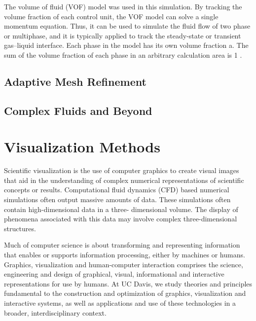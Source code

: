 The volume of fluid (VOF) model was used in this simulation. By tracking the volume fraction of each control unit, the VOF model can solve a single momentum equation. Thus, it can be used to simulate the fluid flow of two phase or multiphase, and it is typically applied to track the steady-state or transient gas–liquid interface.
Each phase in the model has its own volume fraction a. The sum of the volume fraction of each phase in an arbitrary calculation area is 1 \cite{lvSimulationFlowFluid2013}.
%

\subsection{Adaptive Mesh Refinement}

\subsection{Complex Fluids and Beyond}


\section{Visualization Methods}

Scientific visualization is the use of computer graphics to create visual images that aid in the understanding of complex numerical representations of scientific concepts or results. Computational fluid dynamics (CFD) based numerical simulations often output massive amounts of data. These simulations often contain high-dimensional data in a three- dimensional volume. The display of phenomena associated with this data may involve complex three-dimensional structures.
%

Much of computer science is about transforming and representing information that enables or supports information processing, either by machines or humans. Graphics, visualization and human-computer interaction comprises the science, engineering and design of graphical, visual, informational and interactive representations for use by humans. At UC Davis, we study theories and principles fundamental to the construction and optimization of graphics, visualization and interactive systems, as well as applications and use of these technologies in a broader, interdisciplinary context.
%

